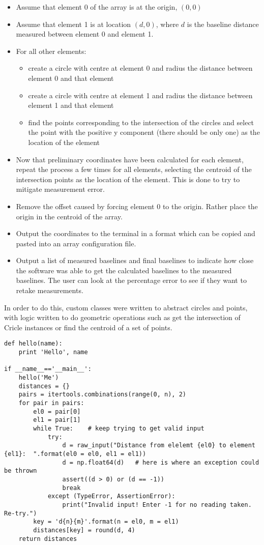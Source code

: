 \begin{itemize}
  \item Assume that element 0 of the array is at the origin, \((0, 0)\)
  \item Assume that element 1 is at location \((d, 0)\), where \(d\) is the baseline distance measured between element 0 and element 1.
  \item For all other elements:
    \begin{itemize}
      \item create a circle with centre at element 0 and radius the distance between element 0 and that element
      \item create a circle with centre at element 1 and radius the distance between element 1 and that element
      \item find the points corresponding to the intersection of the circles and select the point with the positive y component (there should be only one) as the location of the element
    \end{itemize}
  \item Now that preliminary coordinates have been calculated for each element, repeat the process a few times for all elements, selecting the centroid of the intersection points as the location of the element. This is done to try to mitigate measurement error.
  \item Remove the offset caused by forcing element 0 to the origin. Rather place the origin in the centroid of the array.
  \item Output the coordinates to the terminal in a format which can be copied and pasted into an array configuration file. 
  \item Output a list of measured baselines and final baselines to indicate how close the software was able to get the calculated baselines to the measured baselines. The user can look at the percentage error to see if they want to retake measurements.
\end{itemize}

In order to do this, custom classes were written to abstract circles and points, with logic written to do geometric operations such as get the intersection of Cricle instances or find the centroid of a set of points. 

\begin{lstlisting}
def hello(name):
    print 'Hello', name
 
if __name__=='__main__':
    hello('Me')    
    distances = {}
    pairs = itertools.combinations(range(0, n), 2)
    for pair in pairs:
        el0 = pair[0]
        el1 = pair[1]
        while True:    # keep trying to get valid input
            try:
                d = raw_input("Distance from elelemt {el0} to element {el1}:  ".format(el0 = el0, el1 = el1))
                d = np.float64(d)   # here is where an exception could be thrown
                assert((d > 0) or (d == -1))
                break
            except (TypeError, AssertionError):
                print("Invalid input! Enter -1 for no reading taken. Re-try.")
        key = 'd{n}{m}'.format(n = el0, m = el1)
        distances[key] = round(d, 4)
    return distances

\end{lstlisting}
